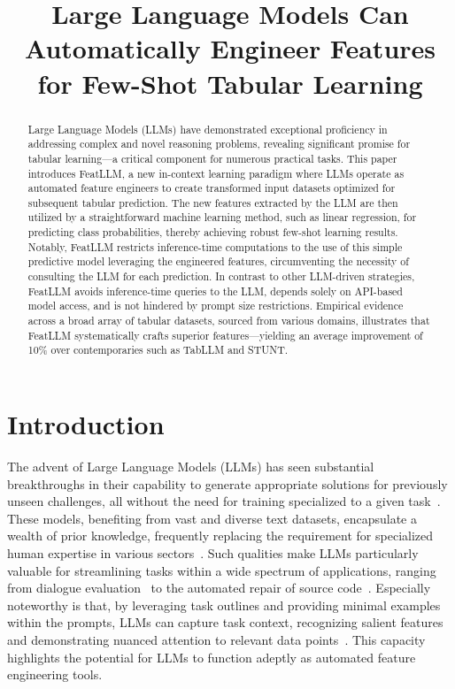 \title{Large Language Models Can Automatically Engineer Features for Few-Shot Tabular Learning}

\begin{abstract}
Large Language Models (LLMs) have demonstrated exceptional proficiency in addressing complex and novel reasoning problems, revealing significant promise for tabular learning—a critical component for numerous practical tasks. This paper introduces \textsf{FeatLLM}, a new in-context learning paradigm where LLMs operate as automated feature engineers to create transformed input datasets optimized for subsequent tabular prediction. The new features extracted by the LLM are then utilized by a straightforward machine learning method, such as linear regression, for predicting class probabilities, thereby achieving robust few-shot learning results. Notably, \textsf{FeatLLM} restricts inference-time computations to the use of this simple predictive model leveraging the engineered features, circumventing the necessity of consulting the LLM for each prediction. In contrast to other LLM-driven strategies, \textsf{FeatLLM} avoids inference-time queries to the LLM, depends solely on API-based model access, and is not hindered by prompt size restrictions. Empirical evidence across a broad array of tabular datasets, sourced from various domains, illustrates that \textsf{FeatLLM} systematically crafts superior features—yielding an average improvement of 10\% over contemporaries such as TabLLM and STUNT.
\end{abstract}

\section{Introduction}
The advent of Large Language Models (LLMs) has seen substantial breakthroughs in their capability to generate appropriate solutions for previously unseen challenges, all without the need for training specialized to a given task~\cite{creswell2022selection,imani2023mathprompter,taylor2022galactica}. These models, benefiting from vast and diverse text datasets, encapsulate a wealth of prior knowledge, frequently replacing the requirement for specialized human expertise in various sectors~\cite{Genomes2021,singhal2023large,wilcox2003role}. Such qualities make LLMs particularly valuable for streamlining tasks within a wide spectrum of applications, ranging from dialogue evaluation~\cite{finch2023leveraging} to the automated repair of source code~\cite{fan2023automated}. Especially noteworthy is that, by leveraging task outlines and providing minimal examples within the prompts, LLMs can capture task context, recognizing salient features and demonstrating nuanced attention to relevant data points~\cite{brown2020language,zhao2023survey}. This capacity highlights the potential for LLMs to function adeptly as automated feature engineering tools.


